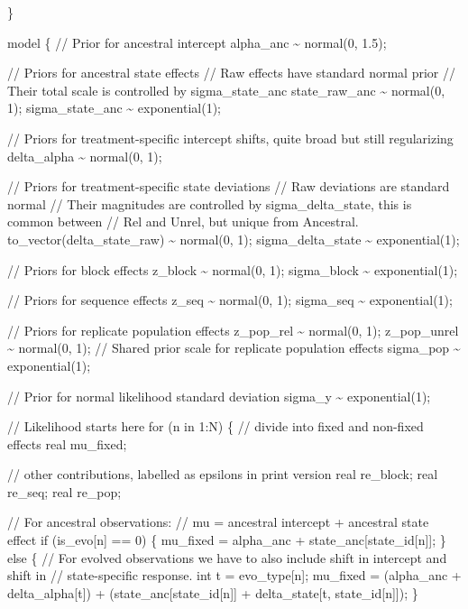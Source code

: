\documentclass[
]{article}
\newenvironment{Shaded}{\begin{snugshade}}{\end{snugshade}}
\newcommand{\StringTok}[1]{\textcolor[rgb]{0.31,0.60,0.02}{#1}}
\begin{document}
\begin{Shaded}
\begin{Highlighting}[]
\StringTok{\}}

\StringTok{model \{}
\StringTok{  // Prior for ancestral intercept}
\StringTok{  alpha\_anc \textasciitilde{} normal(0, 1.5);}

\StringTok{  // Priors for ancestral state effects}
\StringTok{  // Raw effects have standard normal prior}
\StringTok{  // Their total scale is controlled by sigma\_state\_anc}
\StringTok{  state\_raw\_anc \textasciitilde{} normal(0, 1);}
\StringTok{  sigma\_state\_anc \textasciitilde{} exponential(1);}

\StringTok{  // Priors for treatment{-}specific intercept shifts, quite broad but still regularizing}
\StringTok{  delta\_alpha \textasciitilde{} normal(0, 1);}

\StringTok{  // Priors for treatment{-}specific state deviations}
\StringTok{  // Raw deviations are standard normal}
\StringTok{  // Their magnitudes are controlled by sigma\_delta\_state, this is common between}
\StringTok{  // Rel and Unrel, but unique from Ancestral.}
\StringTok{  to\_vector(delta\_state\_raw) \textasciitilde{} normal(0, 1);}
\StringTok{  sigma\_delta\_state \textasciitilde{} exponential(1);}

\StringTok{  // Priors for block  effects}
\StringTok{  z\_block \textasciitilde{} normal(0, 1);}
\StringTok{  sigma\_block \textasciitilde{} exponential(1);}

\StringTok{  // Priors for sequence  effects}
\StringTok{    z\_seq \textasciitilde{} normal(0, 1);}
\StringTok{    sigma\_seq \textasciitilde{} exponential(1);}

\StringTok{  // Priors for replicate population effects}
\StringTok{    z\_pop\_rel \textasciitilde{} normal(0, 1);}
\StringTok{    z\_pop\_unrel \textasciitilde{} normal(0, 1);}
\StringTok{  }
\StringTok{  // Shared prior scale for replicate population effects}
\StringTok{  sigma\_pop \textasciitilde{} exponential(1);}

\StringTok{  // Prior for normal likelihood standard deviation}
\StringTok{  sigma\_y \textasciitilde{} exponential(1);}

\StringTok{  // Likelihood starts here}
\StringTok{  for (n in 1:N) \{}
\StringTok{    // divide into fixed and non{-}fixed effects}
\StringTok{    real mu\_fixed;}

\StringTok{    // other contributions, labelled as epsilons in print version}
\StringTok{    real re\_block;}
\StringTok{    real re\_seq;}
\StringTok{    real re\_pop;}

\StringTok{    // For ancestral observations:}
\StringTok{    // mu = ancestral intercept + ancestral state effect}
\StringTok{    if (is\_evo[n] == 0) \{}
\StringTok{      mu\_fixed = alpha\_anc + state\_anc[state\_id[n]];}
\StringTok{    \} else \{}
\StringTok{      // For evolved observations we have to also include shift in intercept and shift in }
\StringTok{      // state{-}specific response.}
\StringTok{      int t = evo\_type[n];}
\StringTok{      mu\_fixed =}
\StringTok{        (alpha\_anc + delta\_alpha[t]) +}
\StringTok{        (state\_anc[state\_id[n]] + delta\_state[t, state\_id[n]]);}
\StringTok{    \}}


\end{Highlighting}
\end{Shaded}
\end{document}
